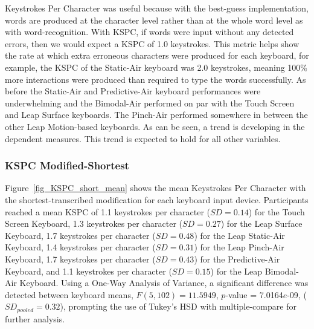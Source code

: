 Keystrokes Per Character was useful because with the best-guess implementation, words are produced at the character level rather than at the whole word level as with word-recognition. With KSPC, if words were input without any detected errors, then we would expect a KSPC of 1.0 keystrokes. This metric helps show the rate at which extra erroneous characters were produced for each keyboard, for example, the KSPC of the Static-Air keyboard was 2.0 keystrokes, meaning 100\% more interactions were produced than required to type the words successfully. As before the Static-Air and Predictive-Air keyboard performances were underwhelming and the Bimodal-Air performed on par with the Touch Screen and Leap Surface keyboards. The Pinch-Air performed somewhere in between the other Leap Motion-based keyboards. As can be seen, a trend is developing in the dependent measures. This trend is expected to hold for all other variables.

\subsubsection{KSPC Modified-Shortest}
Figure~\ref{fig_KSPC_short_mean} shows the mean Keystrokes Per Character with the shortest-transcribed modification for each keyboard input device. Participants reached a mean KSPC of 1.1 keystrokes per character ($SD = 0.14$) for the Touch Screen Keyboard, 1.3 keystrokes per character ($SD = 0.27$) for the Leap Surface Keyboard, 1.7 keystrokes per character ($SD = 0.48$) for the Leap Static-Air Keyboard, 1.4 keystrokes per character ($SD = 0.31$) for the Leap Pinch-Air Keyboard, 1.7 keystrokes per character ($SD = 0.43$) for the Predictive-Air Keyboard, and 1.1 keystrokes per character ($SD = 0.15$) for the Leap Bimodal-Air Keyboard. Using a One-Way Analysis of Variance, a significant difference was detected between keyboard means, $F(5, 102) = 11.5949$, $p$-value = 7.0164$e$-09, ($SD_{pooled} = 0.32$), prompting the use of Tukey's HSD with multiple-compare for further analysis.

